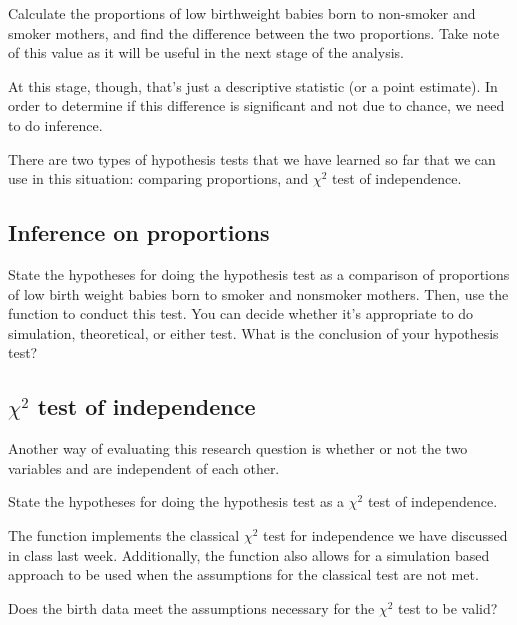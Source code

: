 \documentclass[11pt]{article}
\begin{document}
\begin{exercise}
Calculate the proportions of low birthweight babies born to non-smoker and smoker mothers, and find the difference between the two proportions. Take note of this value as it will be useful in the next stage of the analysis.
\end{exercise}

At this stage, though, that's just a descriptive statistic (or a point estimate).  In order to determine if this difference is significant and not due to chance, we need to do inference.

There are two types of hypothesis tests that we have learned so far that we can use in this situation: comparing proportions, and $\chi^2$ test of independence.

%

\subsection*{Inference on proportions}

\begin{exercise}
State the hypotheses for doing the hypothesis test as a comparison of proportions of low birth weight babies born to smoker and nonsmoker mothers. Then, use the  function to conduct this test. You can decide whether it's appropriate to do simulation, theoretical, or either test. What is the conclusion of your hypothesis test?
\end{exercise}

\subsection*{$\chi^2$ test of independence}

Another way of evaluating this research question is whether or not the two variables  and  are independent of each other.

\begin{exercise}
State the hypotheses for doing the hypothesis test as a $\chi^2$ test of independence.
\end{exercise}

The function  implements the classical $\chi^2$ test for independence we have discussed in class last week. Additionally, the  function also allows for a simulation based approach to be used when the assumptions for the classical test are not met. 

\begin{exercise}
Does the birth data meet the assumptions necessary for the $\chi^2$ test to be valid?
\end{exercise}
\end{document}
